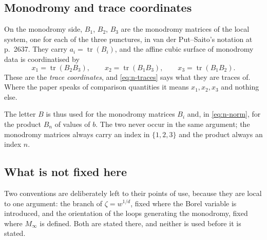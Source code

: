 \subsection{Monodromy and trace coordinates}\label{ssec:traces}

On the monodromy side, $B_1$, $B_2$, $B_3$ are the monodromy matrices of the
local system, one for each of the three punctures, in van der Put--Saito's
notation at p.~2637. They carry $a_i=\operatorname{tr}(B_i)$, and the affine
cubic surface of monodromy data is coordinatised by
\begin{equation}\label{eq:n-traces}
  x_1=\operatorname{tr}(B_2B_3),\qquad
  x_2=\operatorname{tr}(B_1B_3),\qquad
  x_3=\operatorname{tr}(B_1B_2).
\end{equation}
These are the \emph{trace coordinates}, and \eqref{eq:n-traces} says what they
are traces of. Where the paper speaks of comparison quantities it means
$x_1,x_2,x_3$ and nothing else.

The letter $B$ is thus used for the monodromy matrices $B_i$ and, in
\eqref{eq:n-norm}, for the product $B_n$ of values of $b$. The two never occur
in the same argument; the monodromy matrices always carry an index in
$\{1,2,3\}$ and the product always an index $n$.

\subsection{What is not fixed here}\label{ssec:notfixed}

Two conventions are deliberately left to their points of use, because they are
local to one argument: the branch of $\zeta=w^{1/d}$, fixed where the Borel
variable is introduced, and the orientation of the loops generating the
monodromy, fixed where $M_\infty$ is defined. Both are stated there, and
neither is used before it is stated.
